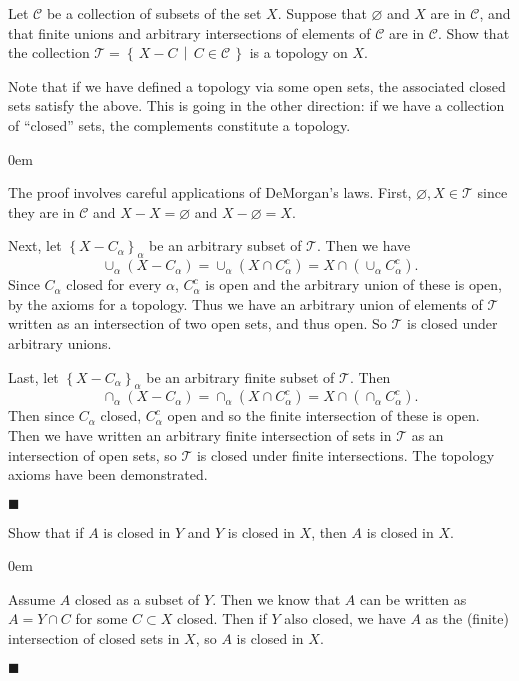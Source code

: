 \documentclass[12pt]{article}
\renewcommand{\qed}{\hfill$\blacksquare$}
\renewenvironment{proof}{\begin{addmargin}[1em]{0em}\begin{newproof}}{\end{newproof}\end{addmargin}\qed}
\newenvironment{problem}[2][Exercise]{\begin{trivlist}
\item[\hskip \labelsep {\bfseries #1}\hskip \labelsep {\bfseries #2.}]}{\end{trivlist}}
\begin{document}
\begin{problem}{17.1}
Let $\mathcal{C}$ be a collection of subsets of the set $X$. Suppose that $\varnothing$ and $X$ are in $\mathcal{C}$, and that finite unions and arbitrary intersections of elements of $\mathcal{C}$ are in $\mathcal{C}$. Show that the collection $ \mathcal{T} = \left\{ \, X-C \, \middle| \, C \in \mathcal{C}\,\right\}$ is a topology on $X$.
\end{problem}
{\color{red}Note that if we have defined a topology via some open sets, the associated closed sets satisfy the above. This is going in the other direction: if we have a collection of ``closed'' sets, the complements constitute a topology.}\\

\begin{proof}
	The proof involves careful applications of DeMorgan's laws. First, $\varnothing, X \in \mathcal{T}$ since they are in $\mathcal{C}$ and $X-X=\varnothing$ and $X-\varnothing=X$.
	
	Next, let $\left\{ X-C_{\alpha}\right\}_{\alpha}$ be an arbitrary subset of $\mathcal{T}$. Then we have $$ \cup_{\alpha} \left(X-C_{\alpha}\right) = \cup_{\alpha} \left(X\cap C^c_{\alpha}\right) = X \cap \left( \cup_{\alpha}  C^c_{\alpha}\right). $$ Since $C_{\alpha}$ closed for every $\alpha$, $C_{\alpha}^c$ is open and the arbitrary union of these is open, by the axioms for a topology. Thus we have an arbitrary union of elements of $\mathcal{T}$ written as an intersection of two open sets, and thus open. So $\mathcal{T}$ is closed under arbitrary unions.
	
	Last, let $\left\{ X-C_{\alpha}\right\}_{\alpha}$ be an arbitrary finite subset of $\mathcal{T}$. Then $$ \cap_{\alpha} \left(X-C_{\alpha}\right) = \cap_{\alpha} \left( X\cap C_{\alpha}^c \right) = X \cap \left(\cap_{\alpha} C^c_{\alpha}\right). $$ Then since $C_{\alpha}$ closed, $C_{\alpha}^c$ open and so the finite intersection of these is open. Then we have written an arbitrary finite intersection of sets in $\mathcal{T}$ as an intersection of open sets, so $\mathcal{T}$ is closed under finite intersections. The topology axioms have been demonstrated.
\end{proof}


\begin{problem}{17.2}
Show that if $A$ is closed in $Y$ and $Y$ is closed in $X$, then $A$ is closed in $X$.
\end{problem}
\begin{proof}
Assume $A$ closed as a subset of $Y$. Then we know that $A$ can be written as $A=Y\cap C$ for some $C\subset X$ closed. Then if $Y$ also closed, we have $A$ as the (finite) intersection of closed sets in $X$, so $A$ is closed in $X$.
\end{proof}
\end{document}
